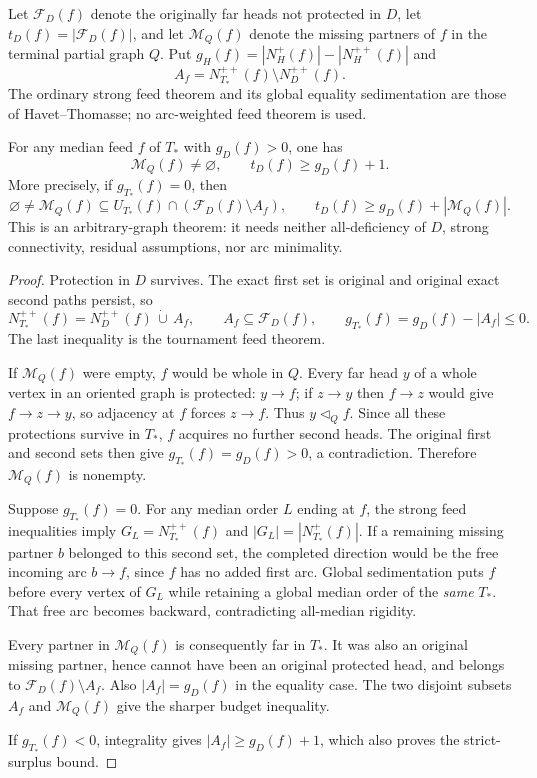 Let $\mathcal F_D(f)$ denote the originally far heads not protected in
$D$, let $t_D(f)=|\mathcal F_D(f)|$, and let $\mathcal M_Q(f)$ denote
the missing partners of $f$ in the terminal partial graph $Q$.
Put $g_H(f)=|N_H^+(f)|-|N_H^{++}(f)|$ and
\[
 A_f=N_{T_*}^{++}(f)\setminus N_D^{++}(f).
\]
The ordinary strong feed theorem and its global equality sedimentation
are those of Havet--Thomasse; no arc-weighted feed theorem is used.

\begin{theorem}
\label{thm:iterated-closure-strict-original-surplus}
For any median feed $f$ of $T_*$ with $g_D(f)>0$, one has
\[
 \mathcal M_Q(f)\ne\varnothing,\qquad
 t_D(f)\ge g_D(f)+1.
\]
More precisely, if $g_{T_*}(f)=0$, then
\[
 \varnothing\ne\mathcal M_Q(f)
     \subseteq U_{T_*}(f)\cap(\mathcal F_D(f)\setminus A_f),
 \qquad
 t_D(f)\ge g_D(f)+|\mathcal M_Q(f)|.
\]
This is an arbitrary-graph theorem: it needs neither all-deficiency of
$D$, strong connectivity, residual assumptions, nor arc minimality.
\end{theorem}
\begin{proof}
Protection in $D$ survives. The exact first set is original and original
exact second paths persist, so
\[
 N_{T_*}^{++}(f)=N_D^{++}(f)\,\dot\cup\,A_f,
 \qquad A_f\subseteq\mathcal F_D(f),\qquad
 g_{T_*}(f)=g_D(f)-|A_f|\le0.
\]
The last inequality is the tournament feed theorem.

If $\mathcal M_Q(f)$ were empty, $f$ would be whole in $Q$. Every far
head $y$ of a whole vertex in an oriented graph is protected: $y\to f$;
if $z\to y$ then $f\to z$ would give $f\to z\to y$, so adjacency
at $f$ forces $z\to f$. Thus $y\triangleleft_Q f$. Since all these
protections survive in $T_*$, $f$ acquires no further second heads.
The original first and second sets then give $g_{T_*}(f)=g_D(f)>0$,
a contradiction. Therefore $\mathcal M_Q(f)$ is nonempty.

Suppose $g_{T_*}(f)=0$. For any median order $L$ ending at $f$, the
strong feed inequalities imply $G_L=N_{T_*}^{++}(f)$ and
$|G_L|=|N_{T_*}^+(f)|$. If a remaining missing partner $b$ belonged
to this second set, the completed direction would be the free incoming
arc $b\to f$, since $f$ has no added first arc. Global sedimentation
puts $f$ before every vertex of $G_L$ while retaining a global median
order of the \emph{same} $T_*$. That free arc becomes backward,
contradicting all-median rigidity.

Every partner in $\mathcal M_Q(f)$ is consequently far in $T_*$.
It was also an original missing partner, hence cannot have been an
original protected head, and belongs to $\mathcal F_D(f)\setminus A_f$.
Also $|A_f|=g_D(f)$ in the equality case. The two disjoint subsets
$A_f$ and $\mathcal M_Q(f)$ give the sharper budget inequality.

If $g_{T_*}(f)<0$, integrality gives
$|A_f|\ge g_D(f)+1$, which also proves the strict-surplus bound.
\end{proof}

